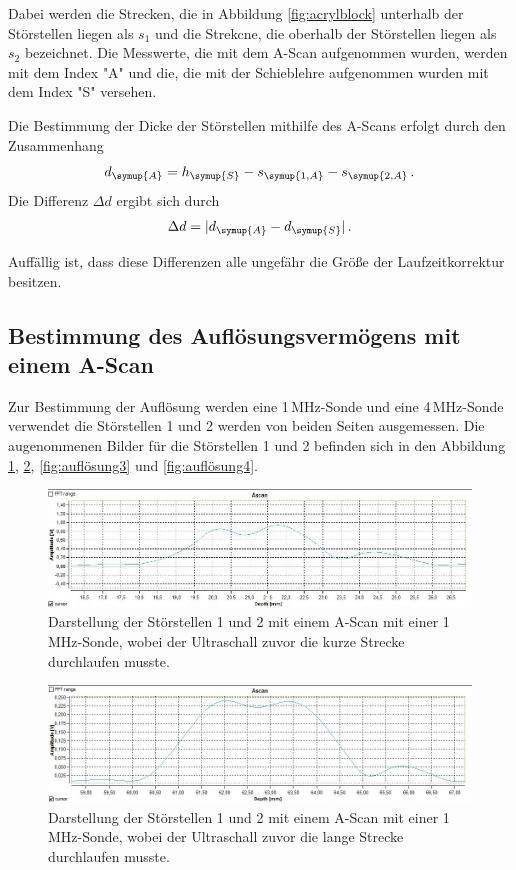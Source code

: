 Dabei werden die Strecken, die in Abbildung \ref{fig:acrylblock} unterhalb der Störstellen liegen
als $s_1$ und die Strekcne, die oberhalb der Störstellen liegen als $s_2$ bezeichnet.
Die Messwerte, die mit dem A-Scan aufgenommen wurden, werden mit dem Index "A"
und die, die mit der Schieblehre aufgenommen wurden mit dem Index "S" versehen.

Die Bestimmung der Dicke der Störstellen mithilfe des A-Scans erfolgt durch den
Zusammenhang
\begin{equation}
  d_{\symup{A}}=h_{\symup{S}}-s_{\symup{1,A}}-s_{\symup{2,A}} \,.
\end{equation}
Die Differenz $\Delta d$ ergibt sich durch
\begin{equation}
  \Delta d=|d_{\symup{A}}-d_{\symup{S}}| \,.
\end{equation}

Auffällig ist, dass diese Differenzen alle ungefähr die Größe der Laufzeitkorrektur
besitzen.

\subsection{Bestimmung des Auflösungsvermögens mit einem A-Scan}
\label{subsec:A_scan_auflösung}

Zur Bestimmung der Auflösung werden eine 1\,MHz-Sonde und eine 4\,MHz-Sonde verwendet die
Störstellen 1 und 2 werden von beiden Seiten ausgemessen.
Die augenommenen Bilder für die Störstellen 1 und 2 befinden sich in den Abbildung \ref{fig:auflösung1},
\ref{fig:auflösung2}, \ref{fig:auflösung3} und \ref{fig:auflösung4}.

\begin{figure}[H]
  \centering
  \includegraphics[width=\textwidth]{data/1mhzdoppelteFehlstellekurzelLaufzeitGedrehtwieinZeichnung.jpeg}
  \caption{Darstellung der Störstellen 1 und 2 mit einem A-Scan mit einer 1\,MHz-Sonde, wobei der Ultraschall
  zuvor die kurze Strecke durchlaufen musste.}
  \label{fig:auflösung1}
\end{figure}

\begin{figure}[H]
  \centering
  \includegraphics[width=\textwidth]{data/1mhzdoppelteFehlstellelangeLaufzeit.jpg}
  \caption{Darstellung der Störstellen 1 und 2 mit einem A-Scan mit einer 1\,MHz-Sonde, wobei der Ultraschall
  zuvor die lange Strecke durchlaufen musste.}
  \label{fig:auflösung2}
\end{figure}

